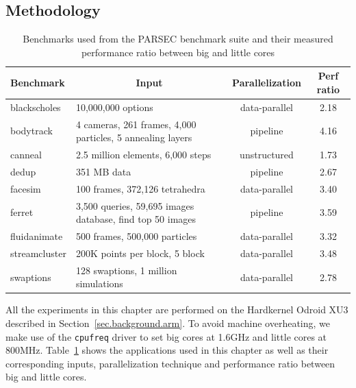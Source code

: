 \subsection{Methodology}

\begin{table}[!t]
	\centering
	\scriptsize
	\caption{Benchmarks used from the PARSEC benchmark suite and their 
		measured performance ratio between big and little cores}
	\setlength{\tabcolsep}{3pt}
	\begin{tabular}{|p{2cm}|p{2.5cm}|c|c|}
		\hline
		\textbf{Benchmark} & \multicolumn{1}{|c|}{\textbf{Input}} & \textbf{Parallelization} & \multicolumn{1}{|c|}{\textbf{Perf ratio}} \\
		\hline \hline
		blackscholes & 10,000,000 options & data-parallel &2.18 \\ \hline
		bodytrack & 4 cameras, 261 frames, 4,000 particles, 5 annealing layers & pipeline & 4.16 \\ \hline
		canneal & 2.5 million elements, 6,000 steps & unstructured & 1.73 \\ \hline
		dedup & 351 MB data & pipeline & 2.67 \\ \hline
		facesim & 100 frames, 372,126 tetrahedra & data-parallel & 3.40 \\ \hline
		ferret & 3,500 queries, 59,695 images database, find top 50 images & pipeline & 3.59 \\ \hline
		fluidanimate & 500 frames, 500,000 particles & data-parallel & 3.32 \\ \hline
		streamcluster & 200K points per block, 5 block & data-parallel & 3.48 \\ \hline
		swaptions & 128 swaptions, 1 million  simulations & data-parallel & 2.78 \\ \hline
	\end{tabular}
	\label{tab.AMC.apps}
\end{table}


All the experiments in this chapter are performed on the Hardkernel Odroid XU3 described in Section~\ref{sec.background.arm}. 
To avoid machine overheating, we make use of the \texttt{cpufreq} driver to set big cores at 1.6GHz and little cores at 800MHz. 
Table~\ref{tab.AMC.apps} shows the applications used in this chapter as well as their corresponding inputs, parallelization technique and performance ratio between big and little cores.

